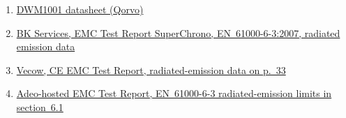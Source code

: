 \begin{enumerate}
  \item \label{ref:dwm1001-datasheet} \href{https://store.qorvo.com/datasheets/qorvo/dwm1001datasheet.pdf}{DWM1001 datasheet (Qorvo)}
  \item \label{ref:bk-superchrono} \href{https://www.steinertsensingsystems.com/wp-content/uploads/2013/06/Certificate-of-Compliance-CE-FCC-SuperChrono-1.pdf}{BK Services, EMC Test Report SuperChrono, EN~61000-6-3:2007, radiated emission data}
  \item \label{ref:vecow-ce-emc} \href{https://www.vecow.com/dispUploadBox/PJ-VECOW/Files/10276.pdf}{Vecow, CE EMC Test Report, radiated-emission data on p.~33}
  \item \label{ref:adeo-emc} \href{https://media.adeo.com/media/1320160/media.pdf}{Adeo-hosted EMC Test Report, EN~61000-6-3 radiated-emission limits in section~6.1}
\end{enumerate}
